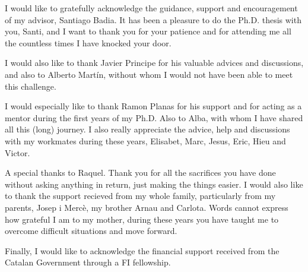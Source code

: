 I would like to gratefully acknowledge the guidance, support and encouragement of my advisor, Santiago Badia. It has been a pleasure to do the Ph.D. thesis with you, Santi, and I want to thank you for your patience and for attending me all the countless times I have knocked your door.

I would also like to thank Javier Principe for his valuable advices and discussions, and also to Alberto Martín, without whom I would not have been able to meet this challenge.

I would especially like to thank Ramon Planas for his support and for acting as a mentor during the first years of my Ph.D. Also to Alba, with whom I have shared all this (long) journey. I also really appreciate the advice, help and discussions with my workmates during these years, Elisabet, Marc, Jesus, Eric, Hieu and Victor.

A special thanks to Raquel. Thank you for all the sacrifices you have done without asking anything in return, just making the things easier. I would also like to thank the support recieved from my whole family, particularly from my parents, Josep i Mercè, my brother Arnau and Carlota. Words cannot express how grateful I am to my mother, during these years you have taught me to overcome difficult situations and move forward.

Finally, I would like to acknowledge the financial support received from the Catalan Government through a FI fellowship.